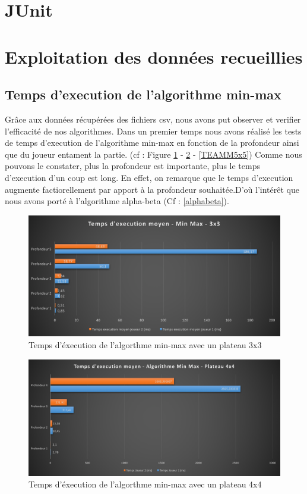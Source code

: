 \documentclass{report}
\begin{document}
	\section{JUnit}
	
	\section{Exploitation des données recueillies}
	
	\subsection{Temps d'execution de l'algorithme min-max} \label{teaminmax}
    Grâce aux données récupérées des fichiers csv, nous avons put observer et verifier l'efficacité de nos algorithmes.
	Dans un premier temps nous avons réalisé les tests de temps d'execution de l'algorithme min-max en fonction de la profondeur ainsi que du joueur entament la partie. (cf : Figure \ref{TEAMM3x3} - \ref{TEAMM4x4} - \ref{TEAMM5x5}) 
	Comme nous pouvons le constater, plus la profondeur est importante, plus le temps d'execution d'un coup est long. En effet, on remarque que le temps d'execution augmente factiorellement par apport à la profondeur souhaitée.D'où l'intérêt que nous avons porté à l'algorithme alpha-beta (Cf : \ref{alphabeta}).
	\begin{figure}[!t]
	    \caption{Temps d'éxecution de l'algorthme min-max avec un plateau 3x3}
	    \label{TEAMM3x3}
	    \includegraphics[scale=0.40]{tempsExecutionMinMax3x3.png}
	\end{figure}
     \begin{figure}[!t]
     	    \caption{Temps d'éxecution de l'algorthme min-max avec un plateau 4x4}
     	    \label{TEAMM4x4}
     	    \includegraphics[scale=0.40]{tempsExecutionMinMax4x4.png}
     \end{figure}
\end{document}
